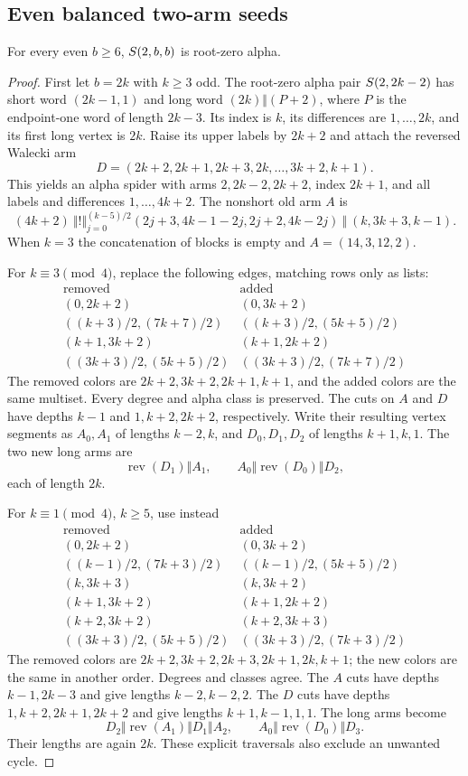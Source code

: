 \subsection{Even balanced two-arm seeds}
\begin{lemma}\label{sa:even-balanced}
For every even $b\ge6$, $S\!\left(2,b,b\right)$ is root-zero alpha.
\end{lemma}
\begin{proof}
First let $b=2k$ with $k\ge3$ odd. The root-zero alpha pair $S\!\left(2,2k-2\right)$ has short word $(2k-1,1)$ and long word $(2k)\Vert(P+2)$, where $P$ is the endpoint-one word of length $2k-3$. Its index is $k$, its differences are $1,\ldots,2k$, and its first long vertex is $2k$. Raise its upper labels by $2k+2$ and attach the reversed Walecki arm
\[
D=(2k+2,2k+1,2k+3,2k,\ldots,3k+2,k+1).
\]
This yields an alpha spider with arms $2,2k-2,2k+2$, index $2k+1$, and all labels and differences $1,\ldots,4k+2$. The nonshort old arm $A$ is
\[
(4k+2)\ \Vert\!!\!\big\Vert_{j=0}^{(k-5)/2}
(2j+3,4k-1-2j,2j+2,4k-2j)\ \Vert\ (k,3k+3,k-1).
\]
When $k=3$ the concatenation of blocks is empty and $A=(14,3,12,2)$.

For $k\equiv3\pmod4$, replace the following edges, matching rows only as lists:
\[
\begin{array}{c|c}
\text{removed}&\text{added}\\\hline
(0,2k+2)&(0,3k+2)\\
((k+3)/2,(7k+7)/2)&((k+3)/2,(5k+5)/2)\\
(k+1,3k+2)&(k+1,2k+2)\\
((3k+3)/2,(5k+5)/2)&((3k+3)/2,(7k+7)/2)
\end{array}
\]
The removed colors are $2k+2,3k+2,2k+1,k+1$, and the added colors are the same multiset. Every degree and alpha class is preserved. The cuts on $A$ and $D$ have depths $k-1$ and $1,k+2,2k+2$, respectively. Write their resulting vertex segments as $A_0,A_1$ of lengths $k-2,k$, and $D_0,D_1,D_2$ of lengths $k+1,k,1$. The two new long arms are
\[
\operatorname{rev}(D_1)\Vert A_1,
\qquad A_0\Vert\operatorname{rev}(D_0)\Vert D_2,
\]
each of length $2k$.

For $k\equiv1\pmod4$, $k\ge5$, use instead
\[
\begin{array}{c|c}
\text{removed}&\text{added}\\\hline
(0,2k+2)&(0,3k+2)\\
((k-1)/2,(7k+3)/2)&((k-1)/2,(5k+5)/2)\\
(k,3k+3)&(k,3k+2)\\
(k+1,3k+2)&(k+1,2k+2)\\
(k+2,3k+2)&(k+2,3k+3)\\
((3k+3)/2,(5k+5)/2)&((3k+3)/2,(7k+3)/2)
\end{array}
\]
The removed colors are $2k+2,3k+2,2k+3,2k+1,2k,k+1$; the new colors are the same in another order. Degrees and classes agree. The $A$ cuts have depths $k-1,2k-3$ and give lengths $k-2,k-2,2$. The $D$ cuts have depths $1,k+2,2k+1,2k+2$ and give lengths $k+1,k-1,1,1$. The long arms become
\[
D_2\Vert\operatorname{rev}(A_1)\Vert D_1\Vert A_2,
\qquad A_0\Vert\operatorname{rev}(D_0)\Vert D_3.
\]
Their lengths are again $2k$. These explicit traversals also exclude an unwanted cycle.


\end{proof}
